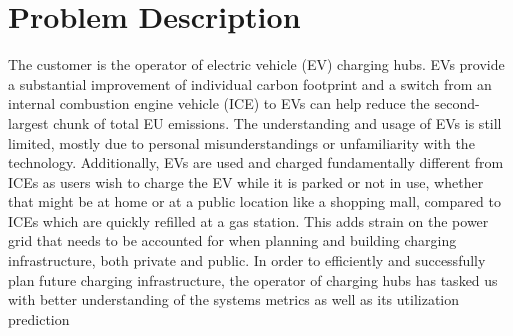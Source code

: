 \clearpage
\section{Problem Description}

The customer is the operator of electric vehicle (EV) charging hubs.
EVs provide a substantial improvement of individual carbon footprint and a switch from an internal combustion engine vehicle (ICE) to EVs can help reduce the second-largest chunk of total EU emissions.
The understanding and usage of EVs is still limited, mostly due to personal misunderstandings or unfamiliarity with the technology.
Additionally, EVs are used and charged fundamentally different from ICEs as users wish to charge the EV while it is parked or not in use, whether that might be at home or at a public location like a shopping mall, compared to ICEs which are quickly refilled at a gas station.
This adds strain on the power grid that needs to be accounted for when planning and building charging infrastructure, both private and public.
In order to efficiently and successfully plan future charging infrastructure, the operator of charging hubs has tasked us with better understanding of the systems metrics as well as its utilization prediction